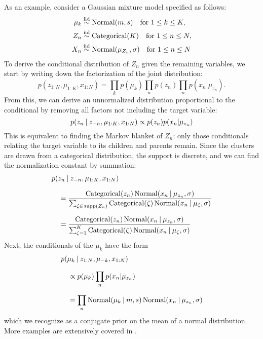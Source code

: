 As an example, consider a Gaussian mixture model specified as follows:
\begin{equation}
  \label{eq:normal-mixture-1}
  \begin{aligned}
    \mu_{k} &\stackrel{\text{iid}}{\sim} \mathrm{Normal}(m, s) \quad\text{for } 1 \le k \le K, \\
    Z_{n} &\stackrel{\text{iid}}{\sim} \mathrm{Categorical}(K) \quad\text{for } 1 \le n \le N, \\
    X_{n} &\stackrel{\text{iid}}{\sim} \mathrm{Normal}(\mu_{Z_{n}}, \sigma) \quad\text{for } 1 \le n \le N
  \end{aligned}
\end{equation}
To derive the conditional distribution of \(Z_{n}\) given the remaining variables, we start by
writing down the factorization of the joint distribution:
\begin{equation}
  p(z_{1:N}, \mu_{1:K}, x_{1:N}) = \prod_{k} p(\mu_{k}) \prod_{n} p(z_{n}) \prod_{n} p(x_{n} | \mu_{z_{n}}).
\end{equation}
From this, we can derive an unnormalized distribution proportional to the conditional by removing
all factors not including the target variable:
\begin{equation}
    p(z_{n} \:\vert\: z_{-n}, \mu_{1:K}, x_{1:N}) \propto p(z_{n}) p(x_{n} | \mu_{z_{n}})
\end{equation}
This is equivalent to finding the Markov blanket of \(Z_{n}\): only those conditionals relating the
target variable to its children and parents remain.  Since the clusters are drawn from a categorical
distribution, the support is discrete, and we can find the normalization constant by summation:
\begin{equation}
  \setlength{\jot}{0.8\baselineskip}
  \begin{aligned}
    &p(z_{n} \given z_{-n}, \mu_{1:K}, x_{1:N}) \\
    &\quad = \dfrac{\distr{Categorical}(z_{n}) \, \Normal(x_{n} \given \mu_{z_{n}}, \sigma)}{
      \sum_{\zeta \in\, \supp(Z_{n})} \distr{Categorical}(\zeta)\, \Normal(x_{n} \given \mu_{\zeta},
      \sigma)} \\
    &\quad = \dfrac{\distr{Categorical}(z_{n}) \, \Normal(x_{n} \given \mu_{z_{n}}, \sigma)}{
      \sum_{\zeta = 1}^{K} \distr{Categorical}(\zeta)\, \Normal(x_{n} \given \mu_{\zeta}, \sigma)}
  \end{aligned}
\end{equation}
Next, the conditionals of the \(\mu_{k}\) have the form
\begin{equation}
  \setlength{\jot}{0.8\baselineskip}
  \begin{aligned}
    &p(\mu_{k} \given z_{1:N}, \mu_{-k}, x_{1:N}) \\
    &\quad \propto p(\mu_k) \prod_{n} p(x_{n} | \mu_{z_{n}}) \\
    &\quad = \prod_{n} \Normal(\mu_{k} \given m, s) \, \Normal(x_{n} \given \mu_{z_{n}}, \sigma)
  \end{aligned}
\end{equation}
which we recognize as a conjugate prior on the mean of a normal distribution.
More examples are extensively covered in \textcite[chapter 24.2]{murphy2012machine}.

